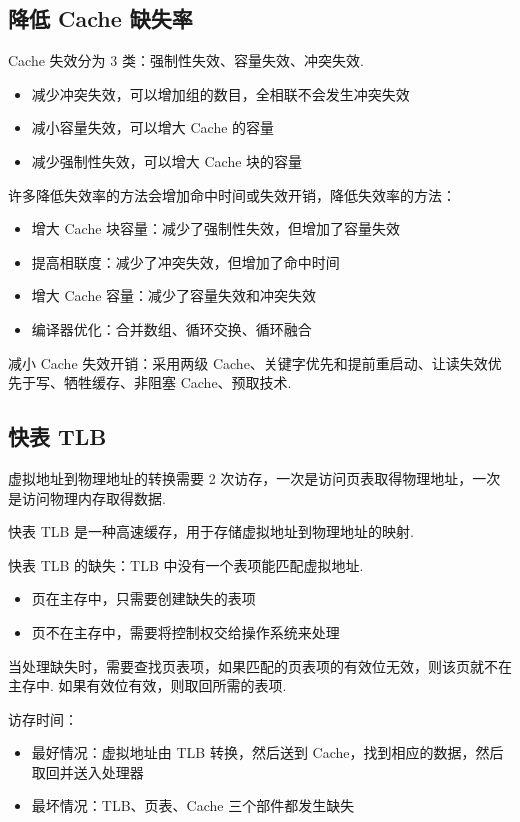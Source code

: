 \documentclass[cn, hazy, blue, normal, 12pt]{elegantnote}
\begin{document}
\subsection{降低 Cache 缺失率}

Cache 失效分为 3 类：强制性失效、容量失效、冲突失效.

\begin{itemize}
    \item 减少冲突失效，可以增加组的数目，全相联不会发生冲突失效
    \item 减小容量失效，可以增大 Cache 的容量
    \item 减少强制性失效，可以增大 Cache 块的容量
\end{itemize}

许多降低失效率的方法会增加命中时间或失效开销，降低失效率的方法：

\begin{itemize}
    \item 增大 Cache 块容量：减少了强制性失效，但增加了容量失效
    \item 提高相联度：减少了冲突失效，但增加了命中时间
    \item 增大 Cache 容量：减少了容量失效和冲突失效
    \item 编译器优化：合并数组、循环交换、循环融合
\end{itemize}

减小 Cache 失效开销：采用两级 Cache、关键字优先和提前重启动、让读失效优先于写、牺牲缓存、非阻塞 Cache、预取技术.

\subsection{快表 TLB}

虚拟地址到物理地址的转换需要 2 次访存，一次是访问页表取得物理地址，一次是访问物理内存取得数据.

快表 TLB 是一种高速缓存，用于存储虚拟地址到物理地址的映射.

快表 TLB 的缺失：TLB 中没有一个表项能匹配虚拟地址.

\begin{itemize}
    \item 页在主存中，只需要创建缺失的表项
    \item 页不在主存中，需要将控制权交给操作系统来处理
\end{itemize}

当处理缺失时，需要查找页表项，如果匹配的页表项的有效位无效，则该页就不在主存中. 如果有效位有效，则取回所需的表项.

访存时间：

\begin{itemize}
    \item 最好情况：虚拟地址由 TLB 转换，然后送到 Cache，找到相应的数据，然后取回并送入处理器
    \item 最坏情况：TLB、页表、Cache 三个部件都发生缺失
\end{itemize}
\end{document}
